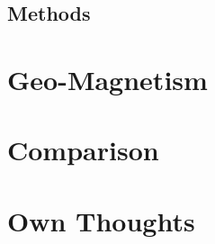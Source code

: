 \documentclass[12pt,a4paper]{article}
\begin{document}
\subsection{Methods}






\section{Geo-Magnetism}


\section{Comparison}



\section{Own Thoughts}




\end{document}

